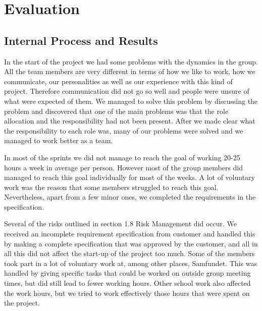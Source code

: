 \section{Evaluation}

\subsection{Internal Process and Results}


	In the start of the project we had some problems with the dynamics in the group. 
	All the team members are very different in terms of how we like to work, how we communicate, 
	our personalities as well as our experience with this kind of project. Therefore communication 
	did not go so well and people were unsure of what were expected of them. We managed to solve 
	this problem by discussing the problem and discovered that one of the main problems was that 
	the role allocation and the responsibility had not been present. After we made clear what the 
	responsibility to each role was, many of our problems were solved and we managed to work better 
	as a team.

	In most of the sprints we did not manage to reach the goal of working 20-25 hours a week in 
	average per person. However most of the group members did managed to reach this goal individually 
	for most of the weeks. A lot of voluntary work was the reason that some members struggled to reach 
	this goal. Nevertheless, apart from a few minor ones, we completed the requirements in the specification.

	Several of the risks outlined in section 1.8 Risk Management did occur. We received an incomplete 
	requirement specification from customer and handled this by making a complete specification that 
	was approved by the customer, and all in all this did not affect the start-up of the project too much. 
	Some of the members took part in a lot of voluntary work at, among other places, Samfundet. This was handled 
	by giving specific tasks that could be worked on outside group meeting times, but did still lead to fewer 
	working hours. Other school work also affected the work hours, but we tried to work effectively those hours 
	that were spent on the project.

